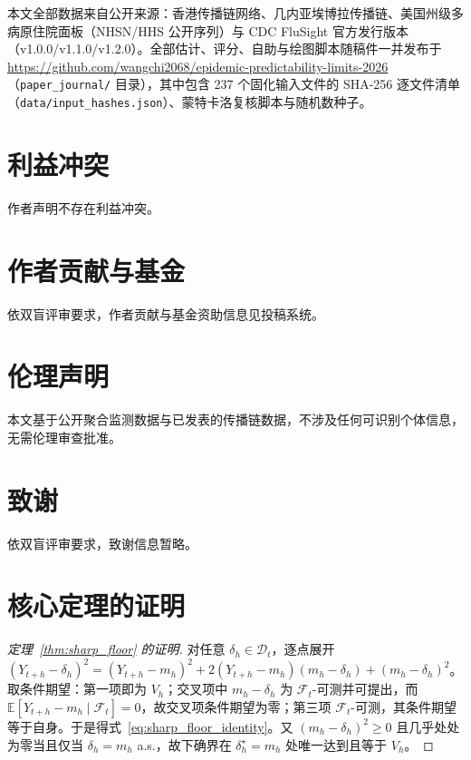 \documentclass[10pt,UTF8,a4paper,zihao=-4]{ctexart}
\theoremstyle{plain}
\theoremstyle{remark}
\begin{document}
本文全部数据来自公开来源：香港传播链网络\citep{adam2020clustering}、几内亚埃博拉传播链\citep{faye2015chains}、美国州级多病原住院面板（NHSN/HHS 公开序列）与 CDC FluSight 官方发行版本（v1.0.0/v1.1.0/v1.2.0）。全部估计、评分、自助与绘图脚本随稿件一并发布于 \url{https://github.com/wangchi2068/epidemic-predictability-limits-2026}（\texttt{paper\_journal/} 目录），其中包含 237 个固化输入文件的 SHA-256 逐文件清单（\texttt{data/input\_hashes.json}）、蒙特卡洛复核脚本与随机数种子。

\section*{利益冲突}

作者声明不存在利益冲突。

\section*{作者贡献与基金}

依双盲评审要求，作者贡献与基金资助信息见投稿系统。

\section*{伦理声明}

本文基于公开聚合监测数据与已发表的传播链数据，不涉及任何可识别个体信息，无需伦理审查批准。

\section*{致谢}

依双盲评审要求，致谢信息暂略。

\clearpage
\appendix
\renewcommand{\thesection}{A}
\section{核心定理的证明}\label{app:proofs}

\renewcommand{\thetheorem}{A\arabic{theorem}}
\setcounter{theorem}{0}

\begin{proof}[定理~\ref{thm:sharp_floor} 的证明]
对任意 $\delta_h \in \mathcal{D}_t$，逐点展开
$(Y_{t+h}-\delta_h)^2 = (Y_{t+h}-m_h)^2 + 2(Y_{t+h}-m_h)(m_h-\delta_h) + (m_h-\delta_h)^2$。
取条件期望：第一项即为 $V_h$；交叉项中 $m_h - \delta_h$ 为 $\mathcal{F}_t$-可测并可提出，而 $\mathbb{E}[Y_{t+h}-m_h \mid \mathcal{F}_t] = 0$，故交叉项条件期望为零；第三项 $\mathcal{F}_t$-可测，其条件期望等于自身。于是得式~\eqref{eq:sharp_floor_identity}。又 $(m_h-\delta_h)^2 \ge 0$ 且几乎处处为零当且仅当 $\delta_h = m_h$ a.s.，故下确界在 $\delta_h^\star = m_h$ 处唯一达到且等于 $V_h$。
\end{proof}
\end{document}
